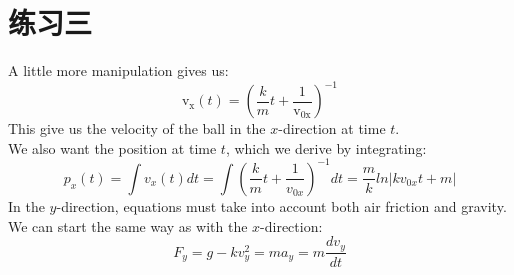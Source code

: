 \documentclass[fleqn]{article}
\begin{document}
\section*{练习三}
\renewcommand{\theequation}{\arabic{equation}}
A little more manipulation gives us: \\
\setcounter{equation}{15}
\begin{equation}
    \mathrm{v_x}(t) = \left(\frac{k}{m}t+\frac{1}{\mathrm{v_{0x}}}\right)^{-1}
\end{equation}
This give us the velocity of the ball in the $x$-direction at time $t$. \\
We also want the position at time $t$, which we derive by integrating: \\
\begin{equation}
    p_x(t) = \int v_x(t)dt = \int \left(\frac{k}{m}t+\frac{1}{v_{0x}}\right)^{-1}dt = \frac{m}{k} ln |kv_{0x}t+m|
\end{equation}
In the $y$-direction, equations must take into account both air friction and gravity. We can start the same way as with the $x$-direction:
\begin{equation}
    F_y = g - kv_y^2 = ma_y = m\frac{dv_y}{dt}
\end{equation}
\end{document}
